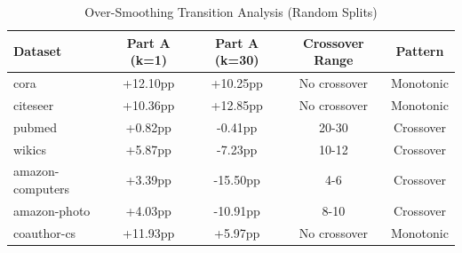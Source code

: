 \begin{table}[t]
\centering
\caption{Over-Smoothing Transition Analysis (Random Splits)}
\label{tab:crossover_analysis_random}
\begin{tabular}{lcccc}
\toprule
\textbf{Dataset} & \textbf{Part A (k=1)} & \textbf{Part A (k=30)} & \textbf{Crossover Range} & \textbf{Pattern} \\
\midrule
cora                 &  +12.10pp &  +10.25pp & No crossover    & Monotonic \\
citeseer             &  +10.36pp &  +12.85pp & No crossover    & Monotonic \\
pubmed               &   +0.82pp &   -0.41pp & 20-30           & Crossover \\
wikics               &   +5.87pp &   -7.23pp & 10-12           & Crossover \\
amazon-computers     &   +3.39pp &  -15.50pp & 4-6             & Crossover \\
amazon-photo         &   +4.03pp &  -10.91pp & 8-10            & Crossover \\
coauthor-cs          &  +11.93pp &   +5.97pp & No crossover    & Monotonic \\
\bottomrule
\end{tabular}
\end{table}
